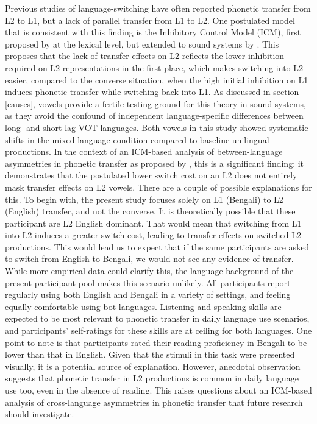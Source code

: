 \documentclass[12 pt]{article}
\begin{document}
Previous studies of language-switching have often reported phonetic transfer from L2 to L1, but a lack of parallel transfer from L1 to L2. One postulated model that is consistent with this finding is the Inhibitory Control Model (ICM), first proposed by \cite{green1986control} at the lexical level, but extended to sound systems by \cite{olson2013bilingual,tsui2019impact}. This proposes that the lack of transfer effects on L2 reflects the lower inhibition required on L2 representations in the first place, which makes switching into L2 easier, compared to the converse situation, when the high initial inhibition on L1 induces phonetic transfer while switching back into L1.  As discussed in section \ref{causes}, vowels provide a fertile testing ground for this theory in sound systems, as they avoid the confound of independent language-specific differences between long- and short-lag VOT languages. Both vowels in this study showed systematic shifts in the mixed-language condition compared to baseline unilingual productions. In the context of an ICM-based analysis of between-language asymmetries in phonetic transfer as proposed by \cite{olson2013bilingual}, this is a significant finding: it demonstrates that the postulated lower switch cost on an L2 does not entirely mask transfer effects on L2 vowels. There are a couple of possible explanations for this. To begin with, the present study focuses solely on L1 (Bengali) to L2 (English) transfer, and not the converse. It is theoretically possible that these participant are L2 English dominant. That would mean that switching from L1 into L2 induces a greater switch cost, leading to transfer effects on switched L2 productions. This would lead us to expect that if the same participants are asked to switch from English to Bengali, we would not see any evidence of transfer. While more empirical data could clarify this, the language background of the present participant pool makes this scenario unlikely. All participants report regularly using both English and Bengali in a variety of settings, and feeling equally comfortable using bot languages. Listening and speaking skills are expected to be most relevant to phonetic transfer in daily language use scenarios, and participants' self-ratings for these skills are at ceiling for both languages. One point to note is that participants rated their reading proficiency in Bengali to be lower than that in English. Given that the stimuli in this task were presented visually, it is a potential source of explanation. However, anecdotal observation suggests that phonetic transfer in L2 productions is common in daily language use too, even in the absence of reading. This raises questions about an ICM-based analysis of cross-language asymmetries in phonetic transfer that future research should investigate.
\end{document}
